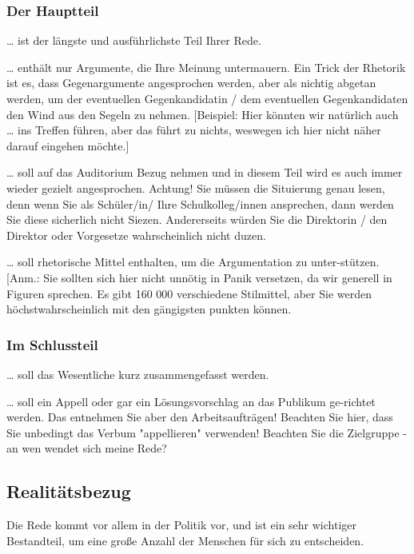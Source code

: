 \subsubsection{Der Hauptteil}
\begin{compactitem}
    \item … ist der längste und ausführlichste Teil Ihrer Rede. 
    \item … enthält nur Argumente, die Ihre Meinung untermauern. Ein Trick der Rhetorik ist es, dass Gegenargumente angesprochen werden, aber als nichtig abgetan werden, um der eventuellen Gegenkandidatin / dem eventuellen Gegenkandidaten den Wind aus den Segeln zu nehmen. [Beispiel: Hier könnten wir natürlich auch … ins Treffen führen, aber das führt zu nichts, weswegen ich hier nicht näher darauf eingehen möchte.] 
    \item … soll auf das Auditorium Bezug nehmen und in diesem Teil wird es auch immer wieder gezielt angesprochen. Achtung! Sie müssen die Situierung genau lesen, denn wenn Sie als Schüler/in/ Ihre Schulkolleg/innen ansprechen, dann werden Sie diese sicherlich nicht Siezen. Andererseits würden Sie die Direktorin / den Direktor oder Vorgesetze wahrscheinlich nicht duzen. 
    \item … soll rhetorische Mittel enthalten, um die Argumentation zu unter-stützen. [Anm.: Sie sollten sich hier nicht unnötig in Panik versetzen, da wir generell in Figuren sprechen. Es gibt 160 000 verschiedene Stilmittel, aber Sie werden höchstwahrscheinlich mit den gängigsten punkten können. 
\end{compactitem}
\subsubsection{Im Schlussteil}
\begin{compactitem}
    \item  … soll das Wesentliche kurz zusammengefasst werden. 
    \item    … soll ein Appell oder gar ein Lösungsvorschlag an das Publikum ge-richtet werden. Das entnehmen Sie aber den Arbeitsaufträgen! Beachten Sie hier, dass Sie unbedingt das Verbum "appellieren" verwenden! Beachten Sie die Zielgruppe - an wen wendet sich meine Rede?
\end{compactitem}

\subsection{Realitätsbezug}
Die Rede kommt vor allem in der Politik vor, und ist ein sehr wichtiger Bestandteil, um eine große Anzahl der Menschen für sich zu entscheiden.  